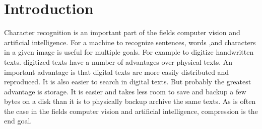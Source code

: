 \section{Introduction} %
\label{sec:introduction}






















Character recognition is an important part of the fields computer vision and artificial intelligence. For a machine to recognize sentences, words ,and characters in a given image is useful for multiple goals. For example to digitize handwritten texts. digitized texts have a number of advantages over physical texts. An important advantage is that digital texts are more easily distributed and reproduced. It is also easier to search in digital texts. But probably the greatest advantage is storage. It is easier and takes less room to save and backup a few bytes on a disk than it is to physically backup archive the same texts. As is often the case in the fields computer vision and artificial intelligence, compression is the end goal.

